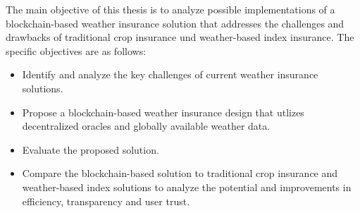 The main objective of this thesis is to analyze possible implementations of a blockchain-based weather insurance solution that addresses the challenges and drawbacks of traditional crop insurance und weather-based index insurance. The specific objectives are as follows:

\begin{itemize}
    \item Identify and analyze the key challenges of current weather insurance solutions.
    \item Propose a blockchain-based weather insurance design that utlizes decentralized oracles and globally available weather data.
    \item Evaluate the proposed solution.
    \item Compare the blockchain-based solution to traditional crop insurance and weather-based index solutions to analyze the potential and improvements in efficiency, transparency and user trust.
\end{itemize}
